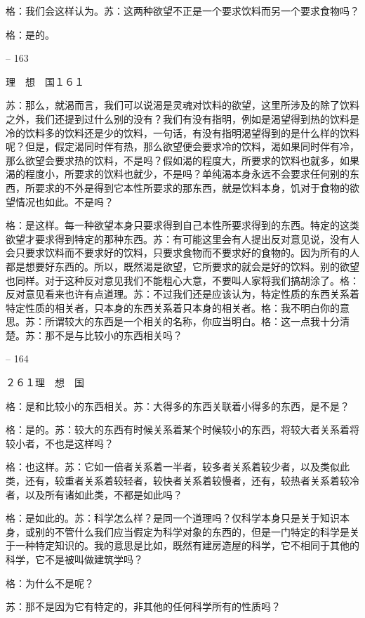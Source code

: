\documentclass[11pt,oneside]{book}
\begin{document}
\begin{common-format}
    格：我们会这样认为。苏：这两种欲望不正是一个要求饮料而另一个要求食物吗？

    格：是的。

    

-- 163

    理　想　国１６１

    苏：那么，就渴而言，我们可以说渴是灵魂对饮料的欲望，这里所涉及的除了饮料之外，我们还提到过什么别的没有？我们有没有指明，例如是渴望得到热的饮料是冷的饮料多的饮料还是少的饮料，一句话，有没有指明渴望得到的是什么样的饮料呢？但是，假定渴同时伴有热，那么欲望便会要求冷的饮料，渴如果同时伴有冷，那么欲望会要求热的饮料，不是吗？假如渴的程度大，所要求的饮料也就多，如果渴的程度小，所要求的饮料也就少，不是吗？单纯渴本身永远不会要求任何别的东西，所要求的不外是得到它本性所要求的那东西，就是饮料本身，饥对于食物的欲望情况也如此。不是吗？

    格：是这样。每一种欲望本身只要求得到自己本性所要求得到的东西。特定的这类欲望才要求得到特定的那种东西。苏：有可能这里会有人提出反对意见说，没有人会只要求饮料而不要求好的饮料，只要求食物而不要求好的食物的。因为所有的人都是想要好东西的。所以，既然渴是欲望，它所要求的就会是好的饮料。别的欲望也同样。对于这种反对意见我们不能粗心大意，不要叫人家将我们搞胡涂了。格：反对意见看来也许有点道理。苏：不过我们还是应该认为，特定性质的东西关系着特定性质的相关者，只本身的东西关系着只本身的相关者。格：我不明白你的意思。苏：所谓较大的东西是一个相关的名称，你应当明白。格：这一点我十分清楚。苏：那不是与比较小的东西相关吗？

    

-- 164

    ２６１理　想　国

    格：是和比较小的东西相关。苏：大得多的东西关联着小得多的东西，是不是？

    格：是的。苏：较大的东西有时候关系着某个时候较小的东西，将较大者关系着将较小者，不也是这样吗？

    格：也这样。苏：它如一倍者关系着一半者，较多者关系着较少者，以及类似此类，还有，较重者关系着较轻者，较快者关系着较慢者，还有，较热者关系着较冷者，以及所有诸如此类，不都是如此吗？

    格：是如此的。苏：科学怎么样？是同一个道理吗？仅科学本身只是关于知识本身，或别的不管什么我们应当假定为科学对象的东西的，但是一门特定的科学是关于一种特定知识的。我的意思是比如，既然有建房造屋的科学，它不相同于其他的科学，它不是被叫做建筑学吗？

    格：为什么不是呢？

    苏：那不是因为它有特定的，非其他的任何科学所有的性质吗？


\end{common-format}
\end{document}
